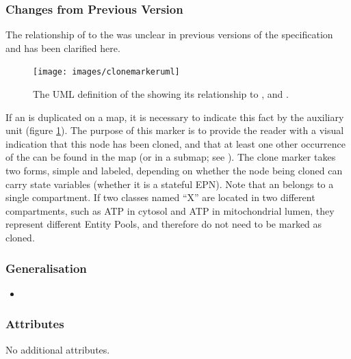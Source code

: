 \subsubsection{Changes from Previous Version}

The relationship of  to the
 was unclear in previous versions of the
specification and has been clarified here.

\label{defn:CloneMarker}
\label{sec:techref:cloneMarker}

\begin{figure}[htb]
  \centering
  \texttt{[image: images/clonemarkeruml]}
  \caption{The UML definition of the  showing
    its relationship to , 
    and .}
  \label{fig:techref:clonemarkeruml}
\end{figure}

If an  is duplicated on a map, it is
necessary to indicate this fact by the 
auxiliary unit (figure \ref{fig:techref:clonemarkeruml}).  The purpose of this
marker is to provide the reader with a visual indication that this
node has been cloned, and that at least one other occurrence of the
 can be found in the map (or in a submap;
see ).  The clone marker takes two forms, simple and
labeled, depending on whether the node being cloned can carry state
variables (\ie whether it is a stateful EPN). Note that an
 belongs to a single compartment. If two
classes named ``X'' are located in two different compartments, such as
ATP in cytosol and ATP in mitochondrial lumen, they represent
different Entity Pools, and therefore do not need to be marked as
cloned.

\subsubsection{Generalisation}

\begin{itemize}
\item {}
\end{itemize}

\subsubsection{Attributes}

No additional attributes.

